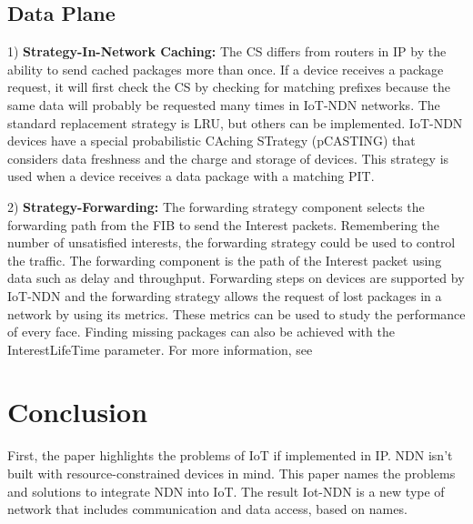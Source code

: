 \documentclass[conference]{IEEEtran}
\begin{document}
\subsection{Data Plane}
1) \textbf{Strategy-In-Network Caching:} 
The CS differs from routers in IP by the ability to send cached packages more than once.
If a device receives a package request, it will first check the CS by checking for matching prefixes
because the same data will probably be requested many times in IoT-NDN networks.
The standard replacement strategy is LRU, but others can be implemented. %
IoT-NDN devices have a special probabilistic CAching STrategy (pCASTING) 
that considers data freshness and the charge and storage of devices. 
This strategy is used %
when a device receives a data package with a matching PIT.

2) \textbf{Strategy-Forwarding:}
The forwarding strategy component selects the forwarding path from the FIB to send the Interest packets. 
Remembering the number of unsatisfied interests, 
the forwarding strategy could be used to control the traffic. 
The forwarding component is the path of the Interest packet using data such as delay and throughput.
Forwarding steps on devices are supported by IoT-NDN and the forwarding strategy
allows the request of lost packages in a network by using its metrics. 
These metrics can be used to study the performance of every face. Finding missing packages
can also be achieved with the InterestLifeTime parameter. For
more information, see \cite{b6}
    
\section{Conclusion}
First, the paper highlights the problems of IoT if implemented in IP. 
NDN isn't built with resource-constrained devices in mind. This paper names the problems and solutions to integrate NDN into IoT.
The result Iot-NDN is a new type of network that includes communication and data access, based on names.
    
\end{document}
